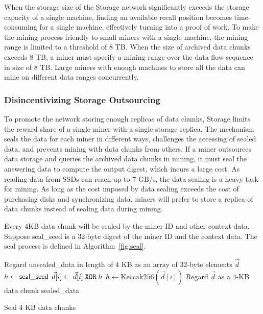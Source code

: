 When the storage size of the \projabbrev Storage network significantly exceeds the storage capacity of a single machine, finding an available recall position becomes time-consuming for a single machine, effectively turning {\sproof} into a proof of work. To make the {\sproof} mining process friendly to small miners with a single machine, the mining range is limited to a threshold of 8 TB. When the size of archived data chunks exceeds 8 TB, a miner must specify a mining range over the data flow sequence in size of 8 TB. Large miners with enough machines to store all the data can mine on different data ranges concurrently.

\subsubsection{Disincentivizing Storage Outsourcing}

To promote the network storing enough replicas of data chunks, \projabbrev Storage limits the reward share of a single miner with a single storage replica. The {\sproof} mechanism seals the data for each miner in different ways, challenges the accessing of sealed data, and prevents mining with data chunks from others. If a miner outsources data storage and queries the archived data chunks in {\sproof} mining, it must seal the answering data to compute the output digest, which incurs a large cost. As reading data from SSDs can reach up to 7 GB/s, the data sealing is a heavy task for {\sproof} mining. As long as the cost imposed by data sealing exceeds the cost of purchasing disks and synchronizing data, miners will prefer to store a replica of data chunks instead of sealing data during {\sproof} mining.

Every 4KB data chunk will be sealed by the miner ID and other context data. Suppose {\sf seal\_seed} is a 32-byte digest of the miner ID and the context data. The seal process is defined in Algorithm~\ref{fig:seal}.

\begin{algorithm}
	\small
	\SetNlSty{}{}{}
	\DontPrintSemicolon
	Regard {\sf unsealed\_data} in length of 4 KB as an array of 32-byte elements $\vec{d}$\;
	$h\leftarrow {\sf seal\_seed}$\;
	 {
		$\vec{d}[i]\leftarrow \vec{d}[i]{\;\tt XOR\;} h$\;
		$h\leftarrow \textrm{Keccak256}(\vec{d}[i])$\;
	}
	Regard $\vec{d}$ as a 4-KB data chunk {\sf sealed\_data}\;
	\caption{Seal 4 KB data chunks}
	\label{fig:seal}
	\vspace{-4mm}
\end{algorithm}


